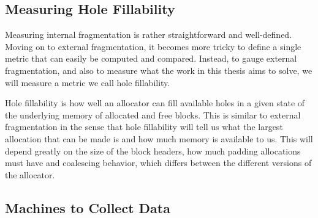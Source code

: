 \subsection{Measuring Hole Fillability}

Measuring internal fragmentation is rather straightforward and well-defined. Moving on to external fragmentation, it becomes more tricky to define a single metric that can easily be computed and compared. Instead, to gauge external fragmentation, and also to measure what the work in this thesis aims to solve, we will measure a metric we call hole fillability.

Hole fillability is how well an allocator can fill available holes in a given state of the underlying memory of allocated and free blocks. This is similar to external fragmentation in the sense that hole fillability will tell us what the largest allocation that can be made is and how much memory is available to us. This will depend greatly on the size of the block headers, how much padding allocations must have and coalescing behavior, which differs between the different versions of the allocator.




\subsection{Machines to Collect Data}


